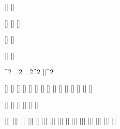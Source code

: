 

\varDef{\angleTwo}{\beta}
\varDef{\angleOne}{\alpha}
\varDef{\angleFour}{\Pi}
\varDef{\angleThree}{\Gamma}

[\mathbb]
[\mathbb]

[\mathcal]
[\mathcal]
[\mathbb]

[\mathcal]
[\mathcal]

[\vectorFmt]
[\unitVecFmt]

^{2}
_{2}
_{2}^{2}
[\vectorFmt]^{2}

\varDef{\rbardot}{\rbar}[\dot]
\varDef{\rbarddot}{\rbar}[\ddot]
[\dot]
\varDef{\rhobardot}{\rhobar}[\dot]
\varDef{\rhodot}{\rho}[\dot]
\varDef{\thetadot}{\theta}[\dot]
[\ddot]
[\ddot]
[\dot]
[\ddot]
[\ddot]
[\dot]
[\ddot]
[\ddot]
[\dot]

[\hat]
[\hat]
[\hat]
[\hat]
[\hat]
[\hat]

[\bar]
[\bar]
[\bar]
[\bar]
[\tilde]
[\bar]
[\bar]
[\bar]
\varDef{\qbardot}{\qbar}[\dot]
[\bar]
[\bar]
[\bar]
[\bar]
\varDef{\rhobar}{\rho}[\bar]
\varDef{\omegabar}{\omega}[\bar]
